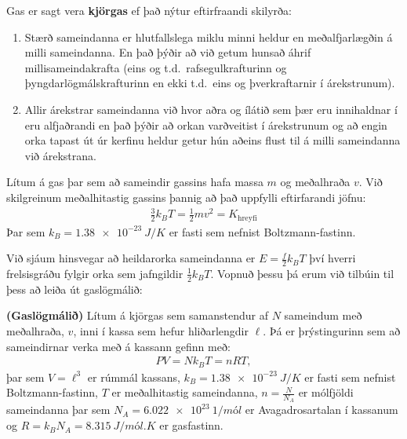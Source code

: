 \ifdefined \wholebook \else\documentclass[oneside]{book}\usepackage{EdlBook}\graphicspath{{figures/}}
\begin{document}
\begin{tcolorbox}
\begin{definition}
Gas er sagt vera \textbf{kjörgas} ef það nýtur eftirfraandi skilyrða:
\begin{enumerate}[label = \textbf{(\roman*)}]
    \item Stærð sameindanna er hlutfallslega miklu minni heldur en meðalfjarlægðin á milli sameindanna. En það þýðir að við getum hunsað áhrif millisameindakrafta (eins og t.d.~rafsegulkrafturinn og þyngdarlögmálskrafturinn en ekki t.d.~eins og þverkraftarnir í árekstrunum).
    
    \item Allir árekstrar sameindanna við hvor aðra og ílátið sem þær eru innihaldnar í eru alfjaðrandi en það þýðir að orkan varðveitist í árekstrunum og að engin orka tapast út úr kerfinu heldur getur hún aðeins flust til á milli sameindanna við árekstrana.
\end{enumerate}
\end{definition}
\end{tcolorbox}

\begin{tcolorbox}
\begin{definition}
Lítum á gas þar sem að sameindir gassins hafa massa $m$ og meðalhraða $v$. Við skilgreinum meðalhitastig gassins þannig að það uppfylli eftirfarandi jöfnu:
\begin{align*}
  \frac{3}{2}k_B T = \frac{1}{2}mv^2 = K_{\text{hreyfi}}
\end{align*}
Þar sem $k_B = \SI{1.38e-23}{J/K}$ er fasti sem nefnist Boltzmann-fastinn.
\end{definition}
\end{tcolorbox}

Við sjáum hinsvegar að heildarorka sameindanna er $E = \frac{f}{2}k_B T$ því hverri frelsisgráðu fylgir orka sem jafngildir $\frac{1}{2}k_B T$. Vopnuð þessu þá erum við tilbúin til þess að leiða út gaslögmálið:


\begin{tcolorbox}
\begin{theorem}
\textbf{(Gaslögmálið)} Lítum á kjörgas sem samanstendur af $N$ sameindum með meðalhraða, $v$, inni í kassa sem hefur hliðarlengdir $\ell$. Þá er þrýstingurinn sem að sameindirnar verka með á kassann gefinn með:
\begin{align*}
    PV = N k_B T = nR T,
\end{align*}
þar sem $V = \ell^3$ er rúmmál kassans, $k_B = \SI{1.38e-23}{J/K}$ er fasti sem nefnist Boltzmann-fastinn, $T$ er meðalhitastig sameindanna, $n = \frac{N}{N_A}$ er mólfjöldi sameindanna þar sem $N_A = \SI{6.022e23}{1/mól}$ er Avagadrosartalan í kassanum og $R = k_B N_A = \SI{8.315}{J/mól.K}$ er gasfastinn.
\end{theorem}
\end{tcolorbox}
\end{document}
